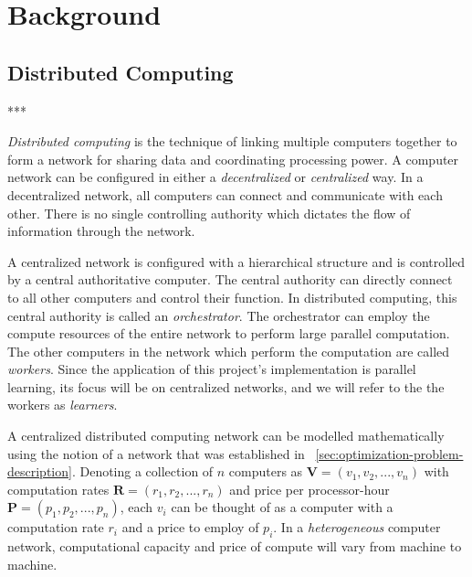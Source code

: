 \documentclass[../mthe-493-final-project.tex]{subfiles}
\begin{document}
    \chapter{Background}
    \label{ch:background}

    \section{Distributed Computing}
    \label{sec:distributed-computing}

    
    ***

    \textit{Distributed computing} is the technique of linking multiple computers together to form a network for sharing data and coordinating processing power. A computer network can be configured in either a \textit{decentralized} or \textit{centralized} way. In a decentralized network, all computers can connect and communicate with each other. There is no single controlling authority which dictates the flow of information through the network.

    A centralized network is configured with a hierarchical structure and is controlled by a central authoritative computer. The central authority can directly connect to all other computers and control their function. In distributed computing, this central authority is called an \textit{orchestrator}. The orchestrator can employ the compute resources of the entire network to perform large parallel computation. The other computers in the network which perform the computation are called \textit{workers}. Since the application of this project's implementation is parallel learning, its focus will be on centralized networks, and we will refer to the the workers as \textit{learners}.

    A centralized distributed computing network can be modelled mathematically using the notion of a network that was established in ~\autoref{sec:optimization-problem-description}. Denoting a collection of $n$ computers as $\mathbf{V} = (v_1, v_2, ..., v_n)$ with computation rates $\mathbf{R} = (r_1, r_2, ..., r_n)$ and price per processor-hour $\mathbf{P} = (p_1, p_2, ..., p_n)$, each $v_i$ can be thought of as a computer with a computation rate $r_i$ and a price to employ of $p_i$. In a \textit{heterogeneous} computer network, computational capacity and price of compute will vary from machine to machine.
\end{document}
